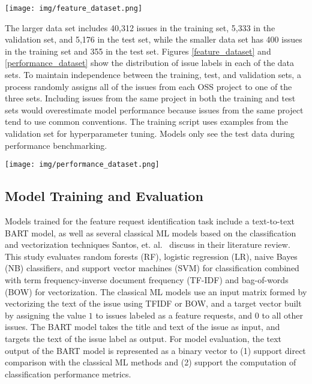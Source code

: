 \begin{figure*}
  \texttt{[image: img/feature\_dataset.png]}
\caption{Distribution of labels in the feature request identification data set.}
\label{feature_dataset}
\end{figure*}

The larger data set includes 40,312 issues in the training set, 5,333 in the validation set, and 5,176 in the test set, while the smaller data set has 400 issues in the training set and 355 in the test set. Figures \ref{feature_dataset} and \ref{performance_dataset} show the distribution of issue labels in each of the data sets. To maintain independence between the training, test, and validation sets, a process randomly assigns all of the issues from each OSS project to one of the three sets. Including issues from the same project in both the training and test sets would overestimate model performance because issues from the same project tend to use common conventions. The training script uses examples from the validation set for hyperparameter tuning. Models only see the test data during performance benchmarking.

\begin{figure*}
  \texttt{[image: img/performance\_dataset.png]}
\caption{Distribution of labels in the performance problem identification data set.}
\label{performance_dataset}
\end{figure*}

\subsection{Model Training and Evaluation}

Models trained for the feature request identification task include a text-to-text BART model, as well as several classical ML models based on the classification and vectorization techniques Santos, et. al.~\cite{santos} discuss in their literature review. This study evaluates random forests (RF), logistic regression (LR), naive Bayes (NB) classifiers, and support vector machines (SVM) for classification combined with term frequency-inverse document frequency (TF-IDF) and bag-of-words (BOW) for vectorization. The classical ML models use an input matrix formed by vectorizing the text of the issue using TFIDF or BOW, and a target vector built by assigning the value $1$ to issues labeled as a feature requests, and $0$ to all other issues. The BART model takes the title and text of the issue as input, and targets the text of the issue label as output. For model evaluation, the text output of the BART model is represented as a binary vector to (1) support direct comparison with the classical ML methods and (2) support the computation of classification performance metrics.

